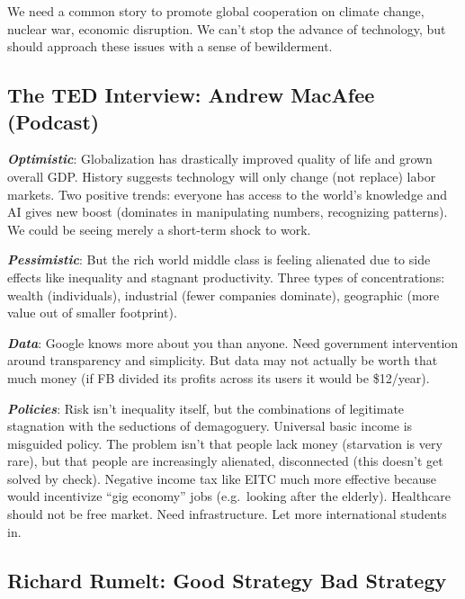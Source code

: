 \documentclass[
]{article}
\begin{document}
We need a common story to promote global cooperation on climate change,
nuclear war, economic disruption. We can't stop the advance of
technology, but should approach these issues with a sense of
bewilderment.

\hypertarget{the-ted-interview-andrew-macafee-podcast}{%
\subsection{The TED Interview: Andrew MacAfee
(Podcast)}\label{the-ted-interview-andrew-macafee-podcast}}

\textbf{\emph{Optimistic}}: Globalization has drastically improved
quality of life and grown overall GDP. History suggests technology will
only change (not replace) labor markets. Two positive trends: everyone
has access to the world's knowledge and AI gives new boost (dominates in
manipulating numbers, recognizing patterns). We could be seeing merely a
short-term shock to work.

\textbf{\emph{Pessimistic}}: But the rich world middle class is feeling
alienated due to side effects like inequality and stagnant productivity.
Three types of concentrations: wealth (individuals), industrial (fewer
companies dominate), geographic (more value out of smaller footprint).

\textbf{\emph{Data}}: Google knows more about you than anyone. Need
government intervention around transparency and simplicity. But data may
not actually be worth that much money (if FB divided its profits across
its users it would be \$12/year).

\textbf{\emph{Policies}}: Risk isn't inequality itself, but the
combinations of legitimate stagnation with the seductions of
demagoguery. Universal basic income is misguided policy. The problem
isn't that people lack money (starvation is very rare), but that people
are increasingly alienated, disconnected (this doesn't get solved by
check). Negative income tax like EITC much more effective because would
incentivize ``gig economy'' jobs (e.g.~looking after the elderly).
Healthcare should not be free market. Need infrastructure. Let more
international students in.

\hypertarget{richard-rumelt-good-strategy-bad-strategy}{%
\subsection{Richard Rumelt: Good Strategy Bad
Strategy}\label{richard-rumelt-good-strategy-bad-strategy}}
\end{document}
